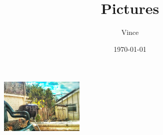 \documentclass{article}
\title{Pictures}
\author{Vince}
\date{\today}
\begin{document}
\maketitle

\begin{center}
\includegraphics[width=4cm]{duck.png}
\end{center}
\end{document}
